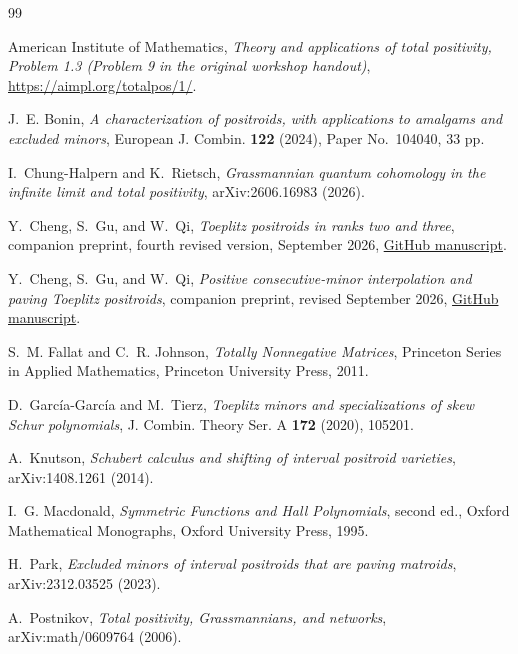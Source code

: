 \documentclass[11pt]{amsart}
\theoremstyle{definition}
\theoremstyle{remark}
\begin{document}
\begin{thebibliography}{99}

American Institute of Mathematics,
\emph{Theory and applications of total positivity, Problem 1.3 (Problem 9 in the original workshop handout)},
\url{https://aimpl.org/totalpos/1/}.

J.~E. Bonin,
\emph{A characterization of positroids, with applications to amalgams and excluded minors},
European J. Combin. \textbf{122} (2024), Paper No.~104040, 33 pp.

I.~Chung-Halpern and K.~Rietsch,
\emph{Grassmannian quantum cohomology in the infinite limit and total positivity},
arXiv:2606.16983 (2026).

Y.~Cheng, S.~Gu, and W.~Qi,
\emph{Toeplitz positroids in ranks two and three},
companion preprint, fourth revised version, September 2026,
\href{https://raw.githubusercontent.com/Cheng-Yaoyu/toeplitz-positroids-ranks-2-3-formalization/main/paper/toeplitz_positroids_ranks_2_3_fourth_revised.pdf}{GitHub manuscript}.

Y.~Cheng, S.~Gu, and W.~Qi,
\emph{Positive consecutive-minor interpolation and paving Toeplitz positroids},
companion preprint, revised September 2026,
\href{https://raw.githubusercontent.com/Cheng-Yaoyu/paving-toeplitz-positroids-formalization/main/paper/positive_consecutive_minor_interpolation_and_paving_toeplitz_positroids.pdf}{GitHub manuscript}.

S.~M. Fallat and C.~R. Johnson,
\emph{Totally Nonnegative Matrices},
Princeton Series in Applied Mathematics, Princeton University Press, 2011.

D.~Garc\'ia-Garc\'ia and M.~Tierz,
\emph{Toeplitz minors and specializations of skew Schur polynomials},
J. Combin. Theory Ser. A \textbf{172} (2020), 105201.

A.~Knutson,
\emph{Schubert calculus and shifting of interval positroid varieties},
arXiv:1408.1261 (2014).

I.~G. Macdonald,
\emph{Symmetric Functions and Hall Polynomials}, second ed.,
Oxford Mathematical Monographs, Oxford University Press, 1995.

H.~Park,
\emph{Excluded minors of interval positroids that are paving matroids},
arXiv:2312.03525 (2023).

A.~Postnikov,
\emph{Total positivity, Grassmannians, and networks},
arXiv:math/0609764 (2006).


\end{thebibliography}
\end{document}
